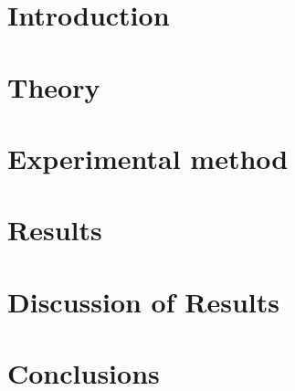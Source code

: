 \documentclass{physics_article_B}
\begin{document}
\section{Introduction \label{intro}}

\section{Theory \label{theory}}

\section{Experimental method \label{method}}

\section{Results \label{results}}

\section{Discussion of Results \label{discussion}}

\section{Conclusions \label{conclusions}}



 
\end{document}
